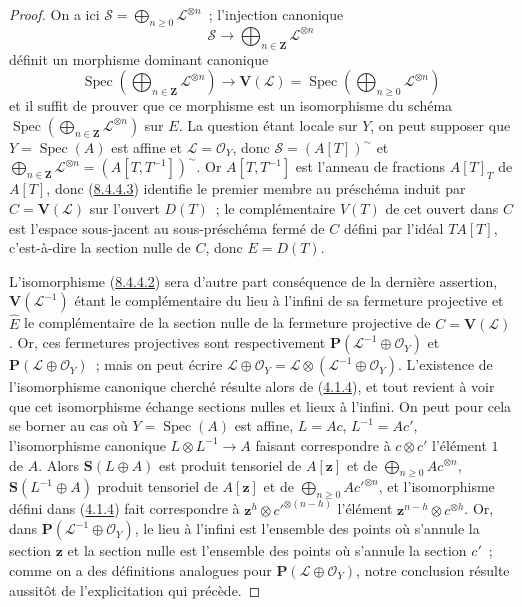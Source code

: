 \begin{proof}
On a ici
$\mathcal{S}=\bigoplus_{n\geq0}\mathcal{L}^{\otimes n}$~; l'injection
canonique
\[
  \mathcal{S}\to\bigoplus_{n\in\mathbf{Z}}\mathcal{L}^{\otimes n}
\]
définit un morphisme dominant canonique
\begin{equation}
\label{II.8.4.4.3-fr}
  \operatorname{Spec}\left(
    \bigoplus_{n\in\mathbf{Z}}\mathcal{L}^{\otimes n}
  \right)
  \to\mathbf{V}(\mathcal{L})
  =\operatorname{Spec}\left(
    \bigoplus_{n\geq0}\mathcal{L}^{\otimes n}
  \right)
\tag{8.4.4.3}
\end{equation}
et il suffit de prouver que ce morphisme est un isomorphisme du schéma
$\operatorname{Spec}(\bigoplus_{n\in\mathbf{Z}}\mathcal{L}^{\otimes n})$
sur $E$. La question étant locale sur $Y$, on peut supposer que
$Y=\operatorname{Spec}(A)$ est affine
et $\mathcal{L}=\mathcal{O}_Y$, donc $\mathcal{S}=(A[T])^{\sim}$ et
$\bigoplus_{n\in\mathbf{Z}}\mathcal{L}^{\otimes n}
=(A[T,T^{-1}])^{\sim}$. Or $A[T,T^{-1}]$ est l'anneau de fractions
$A[T]_T$ de $A[T]$, donc (\hyperref[II.8.4.4.3-fr]{8.4.4.3}) identifie le
premier membre au préschéma induit par $C=\mathbf{V}(\mathcal{L})$ sur
l'ouvert $D(T)$~; le complémentaire $V(T)$ de cet ouvert dans $C$ est
l'espace sous-jacent au sous-préschéma fermé de $C$ défini par l'idéal
$TA[T]$, c'est-à-dire la section nulle de $C$, donc $E=D(T)$.

L'isomorphisme (\hyperref[II.8.4.4.2-fr]{8.4.4.2}) sera d'autre part
conséquence de la dernière assertion, $\mathbf{V}(\mathcal{L}^{-1})$ étant le
complémentaire du lieu à l'infini de sa fermeture projective et $\widehat{E}$
le complémentaire de la section nulle de la fermeture projective de
$C=\mathbf{V}(\mathcal{L})$. Or, ces fermetures projectives sont
respectivement $\mathbf{P}(\mathcal{L}^{-1}\oplus\mathcal{O}_Y)$ et
$\mathbf{P}(\mathcal{L}\oplus\mathcal{O}_Y)$~; mais on peut écrire
$\mathcal{L}\oplus\mathcal{O}_Y
=\mathcal{L}\otimes(\mathcal{L}^{-1}\oplus\mathcal{O}_Y)$. L'existence de
l'isomorphisme canonique cherché résulte alors de
(\hyperref[II.4.1.4-fr]{4.1.4}), et tout revient à voir que cet isomorphisme
échange sections nulles et lieux à l'infini. On peut pour cela se borner au
cas où $Y=\operatorname{Spec}(A)$ est affine,
$L=Ac$, $L^{-1}=Ac'$, l'isomorphisme canonique
$L\otimes L^{-1}\to A$ faisant correspondre à $c\otimes c'$ l'élément $1$
de $A$. Alors $\mathbf{S}(L\oplus A)$ est produit tensoriel de $A[\mathbf{z}]$ et de
$\bigoplus_{n\geq0}Ac^{\otimes n}$, $\mathbf{S}(L^{-1}\oplus A)$ produit
tensoriel de $A[\mathbf{z}]$ et de $\bigoplus_{n\geq0}Ac'^{\otimes n}$, et
l'isomorphisme défini dans (\hyperref[II.4.1.4-fr]{4.1.4}) fait correspondre à
$\mathbf{z}^h\otimes c'^{\otimes(n-h)}$ l'élément
$\mathbf{z}^{n-h}\otimes c^{\otimes h}$. Or, dans
$\mathbf{P}(\mathcal{L}^{-1}\oplus\mathcal{O}_Y)$, le lieu à l'infini est
l'ensemble des points où s'annule la section $\mathbf{z}$ et la section nulle est
l'ensemble des points où s'annule la section $c'$~; comme on a des définitions
analogues pour $\mathbf{P}(\mathcal{L}\oplus\mathcal{O}_Y)$, notre conclusion
résulte aussitôt de l'explicitation qui précède.
\end{proof}

